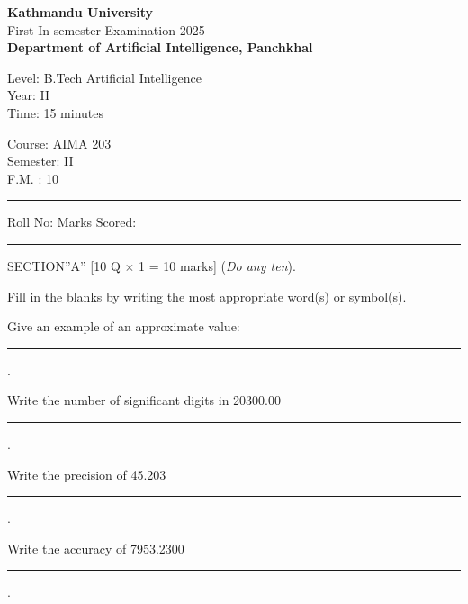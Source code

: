 \documentclass[12pt]{exam}
\begin{document}
\begin{center}
  {\bfseries  {\large Kathmandu University}} \\
  First In-semester Examination-2025 \\[-2mm]
    \textbf{\small Department of Artificial Intelligence, Panchkhal}
\end{center}
\vspace{2mm}

\begin{minipage}{0.70\linewidth}
  \begin{flushleft}
    Level: B.Tech Artificial Intelligence \\
    Year: II \\
    Time: 15 minutes
  \end{flushleft}
\end{minipage} \hfill
\begin{minipage}{0.25\linewidth}
  \begin{flushleft}
    Course: AIMA 203 \\
    Semester: II \\
    F.M. : 10
  \end{flushleft}
\end{minipage}
\vspace{-8mm}
\begin{center}
  \rule{\textwidth}{1pt}
  Roll No: \hspace{5.5cm} Marks Scored:
  \vskip -3mm
\rule{\textwidth}{1pt}
\end{center}



\begin{center}
  SECTION''A'' \hspace{5mm} [10 Q \(\times\) 1 = 10 marks] (\textit{Do any ten}).
\end{center}
Fill in the blanks by writing the most appropriate word(s) or symbol(s).
\begin{questions}
  \question Give an example of an approximate value: \rule{8cm}{0.15mm}.

  \question Write the number of significant digits in 20300.00  \rule{5cm}{0.15mm}.

  \question Write the precision of 45.203 \rule{5cm}{0.15mm}.

  \question Write the accuracy of 7953.2300 \rule{5cm}{0.15mm}.

\end{questions}
\end{document}
